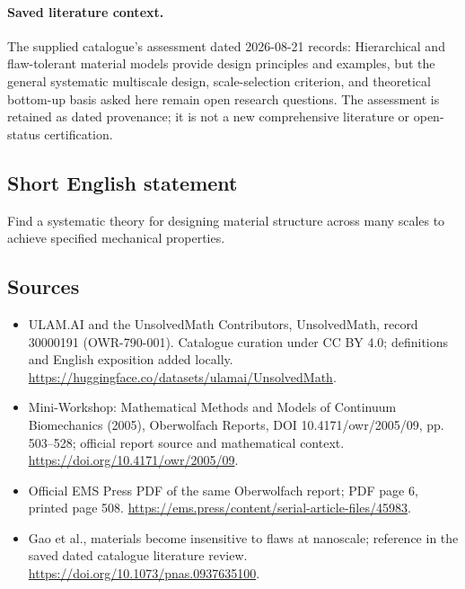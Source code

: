 \documentclass[11pt]{article}
\begin{document}
\paragraph{Saved literature context.} The supplied catalogue's assessment dated 2026-08-21 records: Hierarchical and flaw-tolerant material models provide design principles and examples, but the general systematic multiscale design, scale-selection criterion, and theoretical bottom-up basis asked here remain open research questions. The assessment is retained as dated provenance; it is not a new comprehensive literature or open-status certification.
\subsection{Short English statement}
Find a systematic theory for designing material structure across many scales to achieve specified mechanical properties.
\subsection{Sources}
\begin{itemize}
\item[\hypertarget{source:30000191:1}{S1}] ULAM.AI and the UnsolvedMath Contributors, UnsolvedMath, record 30000191 (OWR-790-001). Catalogue curation under CC BY 4.0; definitions and English exposition added locally.
\url{https://huggingface.co/datasets/ulamai/UnsolvedMath}.
\item[\hypertarget{source:30000191:2}{S2}] Mini-Workshop: Mathematical Methods and Models of Continuum Biomechanics (2005), Oberwolfach Reports, DOI 10.4171/owr/2005/09, pp. 503--528; official report source and mathematical context.
\url{https://doi.org/10.4171/owr/2005/09}.
\item[\hypertarget{source:30000191:3}{S3}] Official EMS Press PDF of the same Oberwolfach report; PDF page 6, printed page 508.
\url{https://ems.press/content/serial-article-files/45983}.
\item[\hypertarget{source:30000191:4}{S4}] Gao et al., materials become insensitive to flaws at nanoscale; reference in the saved dated catalogue literature review.
\url{https://doi.org/10.1073/pnas.0937635100}.
\end{itemize}
\label{end:30000191}
\end{document}
